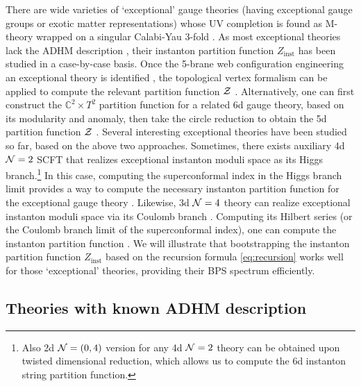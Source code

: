 \documentclass[letterpaper, 11pt]{article}
\def\IC{\mathbb{C}}
\def\CN{{\cal N}}
\def\CZ{{\cal Z}}
\begin{document}
{There are wide varieties of `exceptional' gauge theories (having exceptional gauge groups or exotic matter representations) whose UV completion is found as M-theory wrapped on a singular Calabi-Yau 3-fold \cite{Diaconescu:1998cn, Jefferson:2018irk, Bhardwaj:2018yhy, Apruzzi:2019opn}. 
As most exceptional theories lack the ADHM description \cite{Kim:2018gjo}, their instanton partition function $Z_\text{inst}$ has been studied in a case-by-case basis. Once the 5-brane web configuration engineering an exceptional theory is identified \cite{Zafrir:2015ftn, Hayashi:2018bkd, Hayashi:2019yxj}, the topological vertex formalism can be applied to compute the relevant partition function $\CZ$ \cite{Hollowood:2003cv, Iqbal:2007ii}. 
Alternatively, one can first construct the $\IC^2 \times T^2$ partition function for a related 6d gauge theory, based on its modularity and anomaly, then take the circle reduction to obtain the 5d partition function $\CZ$ \cite{DelZotto:2016pvm, DelZotto:2018tcj}. Several interesting exceptional theories have been studied so far, based on the above two approaches.
Sometimes, there exists auxiliary 4d $\CN=2$ SCFT \cite{Benini:2009gi} that realizes exceptional instanton moduli space as its Higgs branch.\footnote{Also 2d $\CN=(0, 4)$ version \cite{Putrov:2015jpa} for any 4d $\CN=2$ theory can be obtained upon twisted dimensional reduction, which allows us to compute the 6d instanton string partition function.} In this case, computing the superconformal index in the Higgs branch limit provides a way to compute the necessary instanton partition function for the exceptional gauge theory \cite{Gadde:2010te, Gadde:2011uv, Gaiotto:2012uq, Gadde:2015xta, Agarwal:2018ejn}. 
Likewise, 3d $\CN=4$ theory can realize exceptional instanton moduli space via its Coulomb branch \cite{Intriligator:1996ex}. Computing its Hilbert series (or the Coulomb branch limit of the superconformal index), one can compute the instanton partition function \cite{Cremonesi:2013lqa, Cremonesi:2014xha}. 
We will illustrate that bootstrapping the instanton partition function $Z_{\text{inst}}$ based on the recursion formula \eqref{eq:recursion} works well for those `exceptional' theories, providing their BPS spectrum efficiently.



\subsection{Theories with known ADHM description}
\label{subsec:ex-adhm}

}
\end{document}
